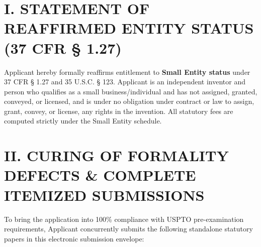 \documentclass[11pt,letterpaper]{article}
\begin{document}
\section*{I. STATEMENT OF REAFFIRMED ENTITY STATUS (37 CFR \S{} 1.27)}

Applicant hereby formally reaffirms entitlement to \textbf{Small Entity status} under 37 CFR \S{} 1.27 and 35 U.S.C. \S{} 123. Applicant is an independent inventor and person who qualifies as a small business/individual and has not assigned, granted, conveyed, or licensed, and is under no obligation under contract or law to assign, grant, convey, or license, any rights in the invention. All statutory fees are computed strictly under the Small Entity schedule.

\section*{II. CURING OF FORMALITY DEFECTS \& COMPLETE ITEMIZED SUBMISSIONS}

To bring the application into 100\% compliance with USPTO pre-examination requirements, Applicant concurrently submits the following standalone statutory papers in this electronic submission envelope:
\end{document}
